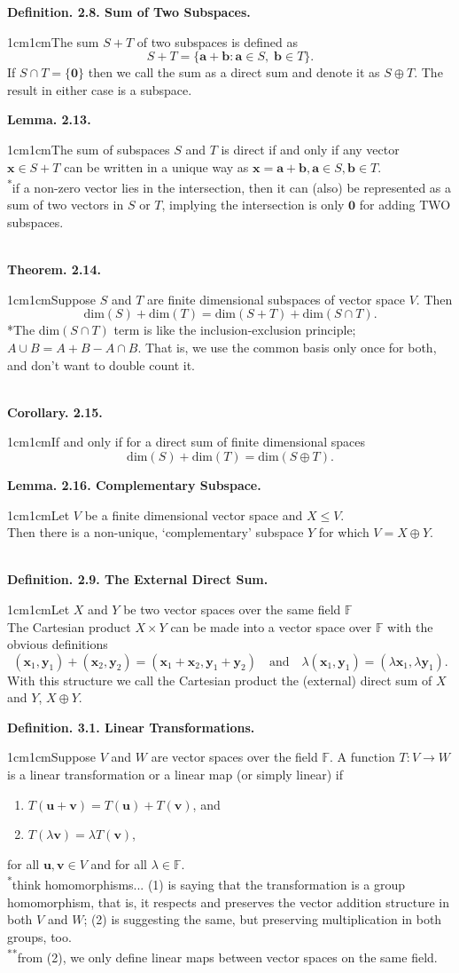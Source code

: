 \documentclass{article}
\newcommand{\vect}[1]{\mathbf{#1}}
\newcommand{\definition}[2]{\textbf{Definition. #1.}\begin{adjustwidth}{1cm}{1cm}#2\end{adjustwidth}}
\newcommand{\theorem}[2]{\textbf{Theorem. #1.}\begin{adjustwidth}{1cm}{1cm}#2\end{adjustwidth}}
\newcommand{\lemma}[2]{\textbf{Lemma. #1.}\begin{adjustwidth}{1cm}{1cm}#2\end{adjustwidth}}
\newcommand{\corollary}[2]{\textbf{Corollary. #1.}\begin{adjustwidth}{1cm}{1cm}#2\end{adjustwidth}}
\begin{document}
\definition{2.8. Sum of Two Subspaces}{The sum $S + T$ of two subspaces is defined as \[S + T = \{ \vect{a} + \vect{b} : \vect{a} \in S, \; \vect{b} \in T \}.\]If $S \cap T = \{ \vect{0} \}$ then we call the sum as a direct sum and denote it as $S \oplus T$. The result in either case is a subspace.}\newpage
\lemma{2.13}{The sum of subspaces $S$ and $T$ is direct if and only if any vector $\vect{x} \in S + T$ can be written in a unique way as $\vect{x} = \vect{a} + \vect{b}, \vect{a} \in S, \vect{b} \in T$.\\[1\baselineskip]\textsuperscript{*}if a non-zero vector lies in the intersection, then it can (also) be represented as a sum of two vectors in $S$ or $T$, implying the intersection is only $\vect{0}$ for adding TWO subspaces.}~\\
\theorem{2.14}{Suppose $S$ and $T$ are finite dimensional subspaces of vector space $V$. Then \[\text{dim}(S) + \text{dim}(T) = \text{dim}(S+T) + \text{dim}(S \cap T).\]{*}The dim$(S \cap T)$ term is like the inclusion-exclusion principle; $A \cup B = A + B - A \cap B$. That is, we use the common basis only once for both, and don't want to double count it.}~\\
\corollary{2.15}{If and only if for a direct sum of finite dimensional spaces \[\text{dim}(S) + \text{dim}(T) = \text{dim}(S \oplus T).\]}
\lemma{2.16. Complementary Subspace}{Let $V$ be a finite dimensional vector space and $X \leq V$.\\Then there is a non-unique, `complementary' subspace $Y$ for which $V = X \oplus Y$.}~\\
\definition{2.9. The External Direct Sum}{Let $X$ and $Y$ be two vector spaces over the same field $\mathbb{F}$\\The Cartesian product $X \times Y$ can be made into a vector space over $\mathbb{F}$ with the obvious definitions \[(\vect{x}_1,\vect{y}_1)+(\vect{x}_2,\vect{y}_2)=(\vect{x}_1+\vect{x}_2,\vect{y}_1+\vect{y}_2) \quad \text{and} \quad \lambda(\vect{x}_1,\vect{y}_1)=(\lambda \vect{x}_1,\lambda \vect{y}_1).\]With this structure we call the Cartesian product the (external) direct sum of $X$ and $Y$, $X \oplus Y$.}\newpage
\definition{3.1. Linear Transformations}{Suppose $V$ and $W$ are vector spaces over the field $\mathbb{F}$. A function $T: V \rightarrow W$ is a linear transformation or a linear map (or simply linear) if \begin{enumerate} \item $T(\vect{u} + \vect{v}) = T(\vect{u}) + T(\vect{v})$, and \item $T(\lambda \vect{v}) = \lambda T(\vect{v})$, \end{enumerate} for all $\vect{u}, \vect{v} \in V$ and for all $\lambda \in \mathbb{F}$.\\[1\baselineskip]\textsuperscript{*}think homomorphisms... (1) is saying that the transformation is a group homomorphism, that is, it respects and preserves the vector addition structure in both $V$ and $W$; (2) is suggesting the same, but preserving multiplication in both groups, too.\\[1\baselineskip]\textsuperscript{**}from (2), we only define linear maps between vector spaces on the same field.}~\\
\end{document}
